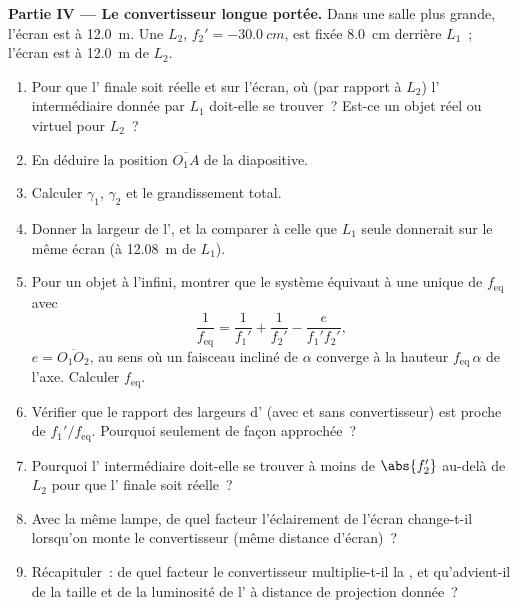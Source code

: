 \begin{problem}
\medskip
\noindent\textbf{Partie IV --- Le convertisseur longue portée.}
Dans une salle plus grande, l'écran est à \qty{12.0}{m}. Une  $L_2$, $f_2' = \qty{-30.0}{cm}$, est fixée \qty{8.0}{cm}
derrière $L_1$~; l'écran est à \qty{12.0}{m} de $L_2$.
\begin{enumerate}[resume]
  \item Pour que l' finale soit réelle et sur l'écran, où (par
        rapport à $L_2$) l' intermédiaire donnée par $L_1$
        doit-elle se trouver~? Est-ce un objet réel ou virtuel pour
        $L_2$~?
  \item En déduire la position $\overline{O_1A}$ de la diapositive.
  \item Calculer $\gamma_1$, $\gamma_2$ et le grandissement total.
  \item Donner la largeur de l', et la comparer à celle que $L_1$
        seule donnerait sur le même écran (à \qty{12.08}{m} de $L_1$).
  \item Pour un objet à l'infini, montrer que le système équivaut à une
         unique de  $f_{\mathrm{eq}}$ avec
        \[
        \frac{1}{f_{\mathrm{eq}}} = \frac{1}{f_1'} + \frac{1}{f_2'} - \frac{e}{f_1' f_2'},
        \]
        $e = \overline{O_1O_2}$, au sens où un faisceau incliné de
        $\alpha$ converge à la hauteur $f_{\mathrm{eq}}\,\alpha$ de
        l'axe. Calculer $f_{\mathrm{eq}}$.
  \item Vérifier que le rapport des largeurs d' (avec et sans
        convertisseur) est proche de $f_1'/f_{\mathrm{eq}}$. Pourquoi
        seulement de façon approchée~?
  \item Pourquoi l' intermédiaire doit-elle se trouver à moins de
        $\abs{f_2'}$ au-delà de $L_2$ pour que l' finale soit
        réelle~?
  \item Avec la même lampe, de quel facteur l'éclairement de l'écran
        change-t-il lorsqu'on monte le convertisseur (même distance
        d'écran)~?
  \item Récapituler~: de quel facteur le convertisseur multiplie-t-il la
        , et qu'advient-il de la taille et de la
        luminosité de l' à distance de projection donnée~?
\end{enumerate}
\end{problem}

